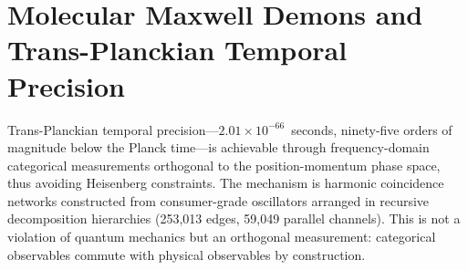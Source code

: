 \chapter{Molecular Maxwell Demons and Trans-Planckian Temporal Precision}
\label{ch:molecular_maxwell}


\begin{chapterabstract}
Trans-Planckian temporal precision---$2.01 \times 10^{-66}$~seconds, ninety-five orders of magnitude below the Planck time---is achievable through frequency-domain categorical measurements orthogonal to the position-momentum phase space, thus avoiding Heisenberg constraints. The mechanism is harmonic coincidence networks constructed from consumer-grade oscillators arranged in recursive \BMD{} decomposition hierarchies (253,013 edges, 59,049 parallel channels). This is not a violation of quantum mechanics but an orthogonal measurement: categorical observables commute with physical observables by construction.
\end{chapterabstract}


